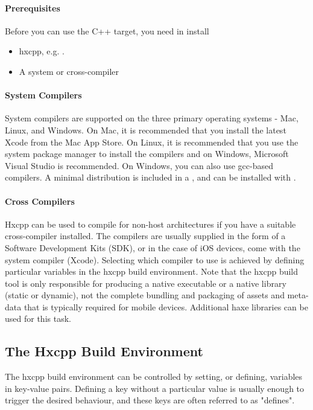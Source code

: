 \paragraph{Prerequisites}
Before you can use the C++ target, you need in install
\begin{itemize}
	\item hxcpp, e.g. .
	\item A system or cross-compiler
\end{itemize}

\paragraph{System Compilers}
System compilers are supported on the three primary operating systems - Mac, Linux, and Windows.  On Mac, it is recommended that you install the latest Xcode from the Mac App Store.  On Linux, it is recommended that you use the system package manager to install the compilers and on Windows, Microsoft Visual Studio is recommended.  On Windows, you can also use gcc-based compilers.  A minimal distribution is included in a , and can be installed with .

\paragraph{Cross Compilers}
Hxcpp can be used to compile for non-host architectures if you have a suitable cross-compiler installed.  The compilers are usually supplied in the form of a Software Development Kits (SDK), or in the case of iOS devices, come with the system compiler (Xcode).  Selecting which compiler to use is achieved by defining particular variables in the hxcpp build environment.  Note that the hxcpp build tool is only responsible for producing a native executable or a native library (static or dynamic), not the complete bundling and packaging of assets and meta-data that is typically required for mobile devices.  Additional haxe libraries can be used for this task.

\subsection{The Hxcpp Build Environment}
\label{target-cpp-build-environment}
The hxcpp build environment can be controlled by setting, or defining, variables in key-value pairs. Defining a key without a particular value is usually enough to trigger the desired behaviour, and these keys are often referred to as "defines".

